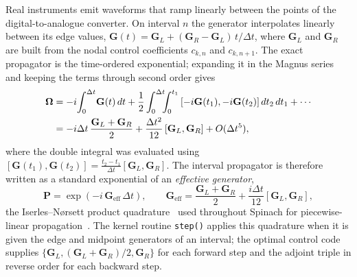 \documentclass[11pt,a4paper]{article}
\newcommand{\code}[1]{\texttt{#1}}
\begin{document}
Real instruments emit waveforms that ramp linearly between the points of
the digital-to-analogue converter. On interval $n$ the generator
interpolates linearly between its edge values,
$\mathbf{G}(t)=\mathbf{G}_L+(\mathbf{G}_R-\mathbf{G}_L)\,t/\Delta t$,
where $\mathbf{G}_{L}$ and $\mathbf{G}_{R}$ are built from the nodal
control coefficients $c_{k,n}$ and $c_{k,n+1}$. The exact propagator is
the time-ordered exponential; expanding it in the Magnus series and
keeping the terms through second order gives
\begin{align}
  \boldsymbol{\Omega}
  &=-i\!\int_0^{\Delta t}\!\mathbf{G}(t)\,dt
    +\frac{1}{2}\int_0^{\Delta t}\!\!\!\int_0^{t_1}
    \left[-i\mathbf{G}(t_1),-i\mathbf{G}(t_2)\right]dt_2\,dt_1
    +\cdots\notag\\
  &=-i\Delta t\,\frac{\mathbf{G}_L+\mathbf{G}_R}{2}
    +\frac{\Delta t^2}{12}\left[\mathbf{G}_L,\mathbf{G}_R\right]
    +O(\Delta t^{5}),
\end{align}
where the double integral was evaluated using
$[\mathbf{G}(t_1),\mathbf{G}(t_2)]
=\frac{t_2-t_1}{\Delta t}[\mathbf{G}_L,\mathbf{G}_R]$. The interval
propagator is therefore written as a standard exponential of an
\emph{effective generator},
\begin{equation}
  \mathbf{P}=\exp(-i\,\mathbf{G}_{\mathrm{eff}}\,\Delta t),
  \qquad
  \mathbf{G}_{\mathrm{eff}}
  =\frac{\mathbf{G}_L+\mathbf{G}_R}{2}
   +\frac{i\Delta t}{12}\left[\mathbf{G}_L,\mathbf{G}_R\right],
  \label{eq:inquad}
\end{equation}
the Iserles--N{\o}rsett product quadrature~\cite{iserles1999} used
throughout Spinach for piecewise-linear
propagation~\cite{rasulov2023}. The kernel routine \code{step()} applies
this quadrature when it is given the edge and midpoint generators of an
interval; the optimal control code supplies
$\{\mathbf{G}_L,(\mathbf{G}_L{+}\mathbf{G}_R)/2,\mathbf{G}_R\}$ for each
forward step and the adjoint triple in reverse order for each backward
step.
\end{document}
